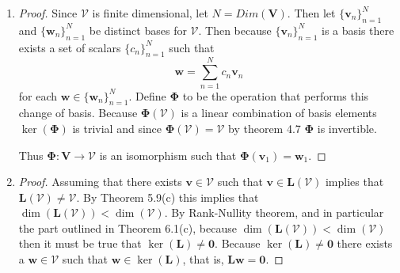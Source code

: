 \documentclass[12pt]{amsart}
\begin{document}
\begin{enumerate}[label=\arabic*.]
\vspace{2.5em}

	\item
\begin{proof}
	Since $\mathcal{V}$ is finite dimensional, let \(N=Dim(\mathbf{V})\).
	Then let \(\{\mathbf{v}_n\}_{n=1}^N\) and \(\{\mathbf{w}_n\}_{n=1}^N\) be distinct bases for $\mathcal{V}$. 
	Then because \(\{\mathbf{v}_n\}_{n=1}^N\) is a basis there exists a
	set of scalars \(\{c_n\}_{n=1}^N\) such that
	\[		\mathbf{w} = \sum_{n=1}^{N}c_n\mathbf{v}_n	\]
	for each $\mathbf{w}\in\{\mathbf{w}_n\}_{n=1}^N$.
	Define \(\boldsymbol{\Phi}\) to be the operation that performs this change of basis.
	Because \(\boldsymbol{\Phi}(\mathcal{V})\) is a linear combination of basis elements \(\operatorname{ker}(\boldsymbol{\Phi})\) is trivial
	and since \(\boldsymbol{\Phi}(\mathcal{V})=\mathcal{V}\) by theorem 4.7 \(\boldsymbol{\Phi}\) is invertible.
	
	Thus \(\boldsymbol{\Phi}:\mathbf{V}\rightarrow\mathcal{V}\) is an isomorphism such that \(\boldsymbol{\Phi}(\mathbf{v}_1)=\mathbf{w}_1\).
\end{proof}
\begin{comment}
	A vector space mapped to itself is implicitely isomorphic.
	Therefore there exists an isomorphism, which is by definition bijective.
\end{comment}

\vspace{2.5em}

	\item 
\begin{proof}
	Assuming that there exists \(\mathbf{v}\in\mathcal{V}\)
	such that \(\mathbf{v}\in\mathbf{L}(\mathcal{V})\)
	implies that \(\mathbf{L}(\mathcal{V}) \neq \mathcal{V}\).
	By Theorem 5.9(c) this implies that \(\dim(\mathbf{L}(\mathcal{V})) < \dim(\mathcal{V})\).
	By Rank-Nullity theorem, and in particular the part outlined in Theorem 6.1(c),
	because \(\dim(\mathbf{L}(\mathcal{V})) < \dim(\mathcal{V})\)
	then it must be true that \(\ker(\mathbf{L}) \neq {\mathbf{0}}\).
	Because \(\ker(\mathbf{L}) \neq {\mathbf{0}}\)
	there exists a \(\mathbf{w}\in\mathcal{V}\)
	such that \(\mathbf{w}\in\ker(\mathbf{L})\),
	that is, \(\mathbf{L}\mathbf{w}=\mathbf{0}\).
\end{proof}


\end{enumerate}
\end{document}
